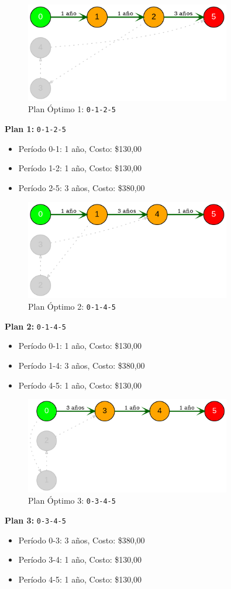\documentclass[12pt]{article}
\begin{document}
\begin{figure}[H]
\centering
\includegraphics[width=0.8\textwidth]{REporteRe1_plan_1.png}
\caption{Plan Óptimo 1: \texttt{0-1-2-5}}
\label{fig:plan1}
\end{figure}

\textbf{Plan 1:} \texttt{0-1-2-5}
\begin{itemize}\small
\item Período 0-1: 1 año, Costo: \$130,00
\item Período 1-2: 1 año, Costo: \$130,00
\item Período 2-5: 3 años, Costo: \$380,00
\end{itemize}

\begin{figure}[H]
\centering
\includegraphics[width=0.8\textwidth]{REporteRe1_plan_2.png}
\caption{Plan Óptimo 2: \texttt{0-1-4-5}}
\label{fig:plan2}
\end{figure}

\textbf{Plan 2:} \texttt{0-1-4-5}
\begin{itemize}\small
\item Período 0-1: 1 año, Costo: \$130,00
\item Período 1-4: 3 años, Costo: \$380,00
\item Período 4-5: 1 año, Costo: \$130,00
\end{itemize}

\begin{figure}[H]
\centering
\includegraphics[width=0.8\textwidth]{REporteRe1_plan_3.png}
\caption{Plan Óptimo 3: \texttt{0-3-4-5}}
\label{fig:plan3}
\end{figure}

\textbf{Plan 3:} \texttt{0-3-4-5}
\begin{itemize}\small
\item Período 0-3: 3 años, Costo: \$380,00
\item Período 3-4: 1 año, Costo: \$130,00
\item Período 4-5: 1 año, Costo: \$130,00
\end{itemize}
\end{document}
